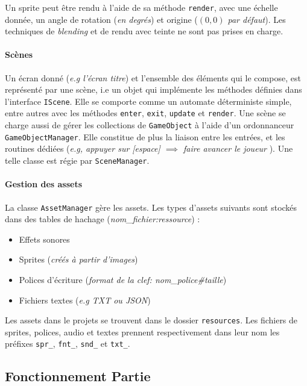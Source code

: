\documentclass[paper=a4,fontsize=12pt,titlepage]{scrartcl}
\begin{document}
    Un sprite peut être rendu à l'aide de sa méthode \verb|render|, avec une échelle donnée, un angle de rotation
    (\textit{en degrés}) et origine (\textit{$(0,0)$ par défaut}). Les techniques de \textit{blending} et de rendu avec teinte
    ne sont pas prises en charge.

    \paragraph{Scènes}
    Un écran donné (\textit{e.g l'écran titre}) et l'ensemble des éléments qui le compose, est représenté par une scène,
    i.e un objet qui implémente les méthodes définies dans l'interface \verb|IScene|. Elle se comporte comme un
    automate déterministe simple, entre autres avec les méthodes \verb|enter|, \verb|exit|, \verb|update| et \verb|render|.
    Une scène se charge aussi de gérer les collections de \verb|GameObject| à l'aide d'un ordonnanceur \verb|GameObjectManager|.
    Elle constitue de plus la liaison entre les entrées, et les routines dédiées (\textit{e.g, appuyer sur [espace] $\implies$ faire avancer le joueur }).
    Une telle classe est régie par \verb|SceneManager|.

    \paragraph{Gestion des assets}
    La classe \verb|AssetManager| gère les assets.
    Les types d'assets suivants sont stockés dans des tables de hachage (\textit{nom\_fichier:ressource}) :
    \begin{itemize}
        \item Effets sonores
        \item Sprites (\textit{créés à partir d'images})
        \item Polices d'écriture (\textit{format de la clef: nom\_police\#taille})
        \item Fichiers textes (\textit{e.g TXT ou JSON})
    \end{itemize}
    Les assets dans le projets se trouvent dans le dossier \verb|resources|.
    Les fichiers de sprites, polices, audio et textes prennent respectivement dans leur nom les préfixes \verb|spr_|, \verb|fnt_|,
    \verb|snd_| et \verb|txt_|.
    
    \subsection{Fonctionnement Partie}\label{subsec:fonctionnement-partie}
\end{document}
